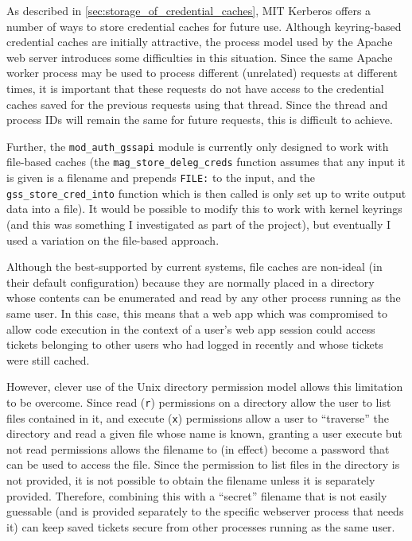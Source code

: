 \documentclass[12pt]{report}
\begin{document}
As described in \autoref{sec:storage_of_credential_caches}, MIT Kerberos offers a number of ways to store credential caches for future use. Although keyring-based credential caches are initially attractive, the process model used by the Apache web server introduces some difficulties in this situation. Since the same Apache worker process may be used to process different (unrelated) requests at different times, it is important that these requests do not have access to the credential caches saved for the previous requests using that thread. Since the thread and process IDs will remain the same for future requests, this is difficult to achieve.

Further, the \verb+mod_auth_gssapi+ module is currently only designed to work with file-based caches (the \verb+mag_store_deleg_creds+ function assumes that any input it is given is a filename and prepends \texttt{FILE:} to the input, and the \verb+gss_store_cred_into+ function which is then called is only set up to write output data into a file). It would be possible to modify this to work with kernel keyrings (and this was something I investigated as part of the project), but eventually I used a variation on the file-based approach.

Although the best-supported by current systems, file caches are non-ideal (in their default configuration) because they are normally placed in a directory whose contents can be enumerated and read by any other process running as the same user. In this case, this means that a web app which was compromised to allow code execution in the context of a user's web app session could access tickets belonging to other users who had logged in recently and whose tickets were still cached.

However, clever use of the Unix directory permission model allows this limitation to be overcome. Since read (\texttt{r}) permissions on a directory allow the user to list files contained in it, and execute (\texttt{x}) permissions allow a user to ``traverse'' the directory and read a given file whose name is known, granting a user execute but not read permissions allows the filename to (in effect) become a password that can be used to access the file. Since the permission to list files in the directory is not provided, it is not possible to obtain the filename unless it is separately provided. Therefore, combining this with a ``secret'' filename that is not easily guessable (and is provided separately to the specific webserver process that needs it) can keep saved tickets secure from other processes running as the same user.
\end{document}

